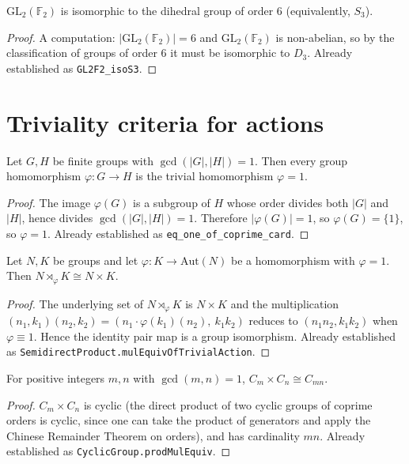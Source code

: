 \begin{lemma}
    \label{lem:GL2F2-isoS3}
    $\mathrm{GL}_2(\mathbb{F}_2)$ is isomorphic to the dihedral group of
    order $6$ (equivalently, $S_3$).
\end{lemma}
\begin{proof}
    A computation: $|\mathrm{GL}_2(\mathbb{F}_2)| = 6$ and
    $\mathrm{GL}_2(\mathbb{F}_2)$ is non-abelian, so by the classification of
    groups of order $6$ it must be isomorphic to $D_3$. Already established
    as \texttt{GL2F2\_isoS3}.
\end{proof}

\section{Triviality criteria for actions}

\begin{lemma}
    \label{lem:eq-one-of-coprime-card}
    Let $G, H$ be finite groups with $\gcd(|G|, |H|) = 1$. Then every group
    homomorphism $\varphi : G \to H$ is the trivial homomorphism $\varphi = 1$.
\end{lemma}
\begin{proof}
    The image $\varphi(G)$ is a subgroup of $H$ whose order divides both
    $|G|$ and $|H|$, hence divides $\gcd(|G|,|H|) = 1$. Therefore
    $|\varphi(G)| = 1$, so $\varphi(G) = \{1\}$, so $\varphi = 1$.
    Already established as \texttt{eq\_one\_of\_coprime\_card}.
\end{proof}

\begin{lemma}
    \label{lem:sdp-trivial-action}
    Let $N, K$ be groups and let $\varphi : K \to \mathrm{Aut}(N)$ be a
    homomorphism with $\varphi = 1$. Then $N \rtimes_\varphi K \cong N \times K$.
\end{lemma}
\begin{proof}
    The underlying set of $N \rtimes_\varphi K$ is $N \times K$ and the
    multiplication
    $(n_1, k_1)(n_2, k_2) = (n_1 \cdot \varphi(k_1)(n_2),\ k_1 k_2)$
    reduces to $(n_1 n_2, k_1 k_2)$ when $\varphi \equiv 1$. Hence the
    identity pair map is a group isomorphism. Already established as
    \texttt{SemidirectProduct.mulEquivOfTrivialAction}.
\end{proof}

\begin{lemma}
    \label{lem:cyclic-prod}
    For positive integers $m, n$ with $\gcd(m, n) = 1$,
    $C_m \times C_n \cong C_{mn}$.
\end{lemma}
\begin{proof}
    $C_m \times C_n$ is cyclic (the direct product of two cyclic groups of
    coprime orders is cyclic, since one can take the product of generators
    and apply the Chinese Remainder Theorem on orders), and has cardinality
    $mn$. Already established as \texttt{CyclicGroup.prodMulEquiv}.
\end{proof}

